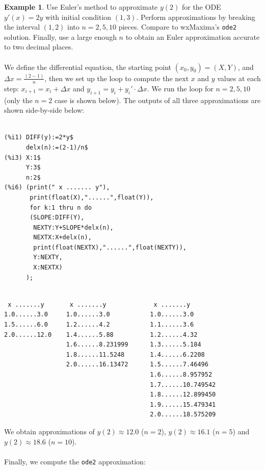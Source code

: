 \documentclass[10.5pt,twoside]{report}
\theoremstyle{definition}
\newtheorem{exmp}{Example}[section]
\begin{document}
\begin{exmp} Use Euler's method to approximate $y(2)$ for the ODE $y'(x)=2y$ with initial condition $(1,3)$.  Perform approximations by breaking the interval $(1,2)$ into $n=2,5,10$ pieces.  Compare to wxMaxima's \verb|ode2| solution.  Finally, use a large enough $n$ to obtain an Euler approximation accurate to two decimal places.\\
${}$\\
We define the differential equation, the starting point $(x_0,y_0)=(X,Y)$, and $\Delta x =\frac{(2-1)}{n}$, then we set up the loop to compute the next $x$ and $y$ values at each step:  $x_{i+1}=x_i+\Delta x$ and $y_{i+1}= y_i+y_i'\cdot \Delta x$.  We run the loop for $n=2,5,10$ (only the $n=2$ case is shown below).  The outputs of all three approximations are shown side-by-side below:

 
\begin{verbatim}

(%i1) DIFF(y):=2*y$
      delx(n):=(2-1)/n$
(%i3) X:1$
      Y:3$
      n:2$
(%i6) (print(" x ....... y"),
       print(float(X),"......",float(Y)),
       for k:1 thru n do
       (SLOPE:DIFF(Y),
        NEXTY:Y+SLOPE*delx(n),
        NEXTX:X+delx(n),
        print(float(NEXTX),"......",float(NEXTY)),
        Y:NEXTY,
        X:NEXTX)
      );

\end{verbatim}
\pagebreak
\begin{verbatim} 
  
 x .......y       x .......y             x .......y  
1.0......3.0     1.0......3.0           1.0......3.0
1.5......6.0     1.2......4.2           1.1......3.6
2.0......12.0    1.4......5.88          1.2......4.32
                 1.6......8.231999      1.3......5.184
                 1.8......11.5248       1.4......6.2208
                 2.0......16.13472      1.5......7.46496
                                        1.6......8.957952
                                        1.7......10.749542
                                        1.8......12.899450
                                        1.9......15.479341
                                        2.0......18.575209

\end{verbatim}

We obtain approximations of $y(2)\approx 12.0$ ($n=2$), $y(2)\approx 16.1$ ($n=5$) and $y(2)\approx 18.6$ ($n=10$).\\
${}$\\
Finally, we compute the \verb|ode2| approximation:


\end{exmp}
\end{document}
